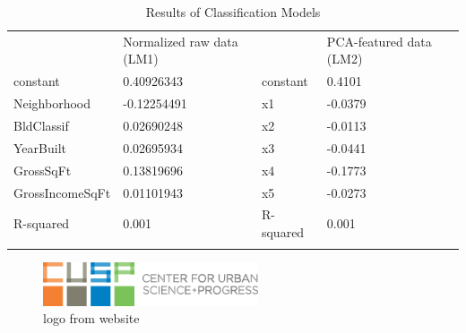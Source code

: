\documentclass[10pt,twocolumn]{article}
\begin{document}
\begin{center}
\begin{table}[]
\centering
\caption{Results of Classification Models}
\label{my-label}
\begin{tabular}{lllll}
                & Normalized raw data (LM1) &          & PCA-featured data (LM2) & \\
constant        & 0.40926343                & constant & 0.4101                  & \\
Neighborhood    & -0.12254491               & x1       & -0.0379                 & \\
BldClassif      & 0.02690248                & x2       & -0.0113                 & \\
YearBuilt       & 0.02695934                & x3       & -0.0441                 & \\
GrossSqFt       & 0.13819696                & x4       & -0.1773                 & \\
GrossIncomeSqFt & 0.01101943                & x5       & -0.0273                 & \\
R-squared       & 0.001                     & R-squared& 0.001                   & \\
                &                           &          &                         &
\end{tabular}
\end{table}
\end{center}

\begin{figure}[!t]
  \begin{center}
    \includegraphics[width=2.5in]{cusp-index.png}
  \end{center}

  \caption{\CUSP logo from website}
  \label{fig-1}
\end{figure}
\end{document}
